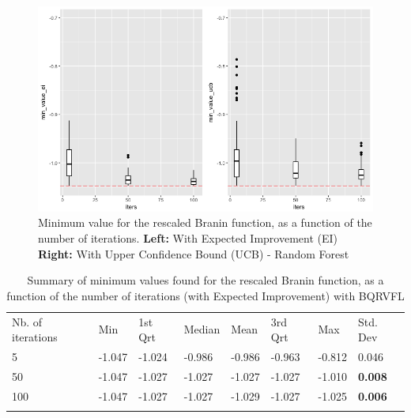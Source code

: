 \begin{figure}[!htb]
\centering
\includegraphics[width=13cm]{gfx/chapter-bayesianrvfl/evol_iter_ei_ucb_rf.png}
\caption{Minimum value for the rescaled Branin function, as a function of the number of iterations. 
\textbf{Left:} With Expected Improvement (EI) \textbf{Right:} With Upper Confidence Bound (UCB) - Random Forest}
\label{min_value_dist_rf}
\end{figure}

\begin{table}[!htb]
\begin{center}
\caption{Summary of minimum values found for the rescaled Branin function, as a function of the number of iterations (with Expected Improvement) with BQRVFL}
\label{tab:min_values_bqrvfl_ei}       %
\begin{tabular}{llllllll}
\hline\noalign{\smallskip}
Nb. of iterations & Min & 1st Qrt  & Median & Mean  & 3rd Qrt  & Max & Std. Dev \\
\noalign{\smallskip}\hline\noalign{\smallskip}
  5   & -1.047 & -1.024 & -0.986 & -0.986 & -0.963 & -0.812 & 0.046  \\
  50  & -1.047 & -1.027 & -1.027 & -1.027 & -1.027 & -1.010 & \textbf{0.008} \\
  100 & -1.047 & -1.027 & -1.027 & -1.029 & -1.027 & -1.025 & \textbf{0.006} \\
\noalign{\smallskip}\hline
\end{tabular}
\end{center}
\end{table}


